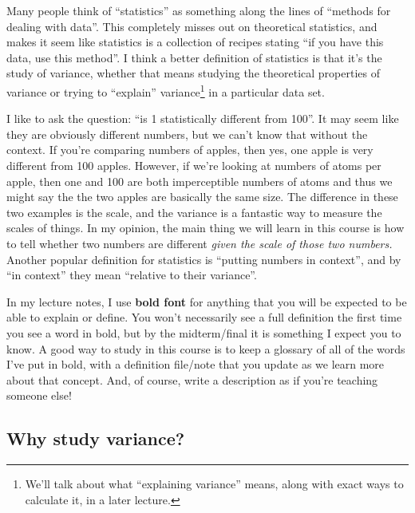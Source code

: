 \documentclass[
  letterpaper,
  DIV=11,
  numbers=noendperiod,
  oneside]{scrreprt}
\begin{document}
Many people think of ``statistics'' as something along the lines of
``methods for dealing with data''. This completely misses out on
theoretical statistics, and makes it seem like statistics is a
collection of recipes stating ``if you have this data, use this
method''. I think a better definition of statistics is that it's the
study of variance, whether that means studying the theoretical
properties of variance or trying to ``explain'' variance\footnote{We'll
  talk about what ``explaining variance'' means, along with exact ways
  to calculate it, in a later lecture.} in a particular data set.

I like to ask the question: ``is 1 statistically different from 100''.
It may seem like they are obviously different numbers, but we can't know
that without the context. If you're comparing numbers of apples, then
yes, one apple is very different from 100 apples. However, if we're
looking at numbers of atoms per apple, then one and 100 are both
imperceptible numbers of atoms and thus we might say the the two apples
are basically the same size. The difference in these two examples is the
scale, and the variance is a fantastic way to measure the scales of
things. In my opinion, the main thing we will learn in this course is
how to tell whether two numbers are different \emph{given the scale of
those two numbers.} Another popular definition for statistics is
``putting numbers in context'', and by ``in context'' they mean
``relative to their variance''.

In my lecture notes, I use \textbf{bold font} for anything that you will
be expected to be able to explain or define. You won't necessarily see a
full definition the first time you see a word in bold, but by the
midterm/final it is something I expect you to know. A good way to study
in this course is to keep a glossary of all of the words I've put in
bold, with a definition file/note that you update as we learn more about
that concept. And, of course, write a description as if you're teaching
someone else!

\hypertarget{why-study-variance}{%
\subsection{Why study variance?}\label{why-study-variance}}
\end{document}
